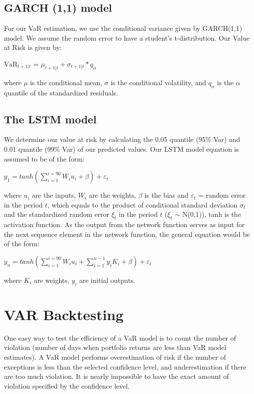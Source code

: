 \documentclass[a4paper,11pt,oneside]{book}
\begin{document}
\subsection{GARCH (1,1) model}

For our VaR estimation, we use the conditional variance given by GARCH(1,1) model. We assume the random error to have a student’s t-distribution. Our Value at Risk is given by:
\begin{center}
$\text{VaR}_{t+1|t}$ = $\mu_{t+1|t} + \sigma_{t+1|t} * q_{\alpha}$
\end{center}
where $\mu$ is the conditional mean, $\sigma$ is the conditional volatility, and $q_{\alpha}$ is the $\alpha$ quantile of the standardized residuals.

\subsection{The LSTM model}
We determine our value at risk by calculating the 0.05 quantile (95\% Var) and 0.01 quantile (99\% Var) of our predicted values. Our LSTM model equation is assumed to be of the form:
\begin{center}
	$y_1= tanh(\sum_{i=1}^{i=90}W_{i}u_{i}+\beta)+\varepsilon_t$
\end{center} 

where $u_{i}$ are the inputs, $W_i$ are the weights, $\beta$ is the bias and $\varepsilon_t$ = random error in the period $t$, which equals to the
product of conditional standard deviation $\sigma_t$ and  the
standardized random error $\xi_t$ in the period $t$ ($\xi_t$ $\sim$ N(0,1)), tanh is the activation function. As the output from the network function serves as input for the next sequence element in the network function, the general equation would be of the form:

\begin{center}
	$y_n= tanh(\sum_{i=1}^{i=90}W_{i}u_{i}+\sum_{i=1}^{n-1}y_{i}K_{i}+\beta)+\varepsilon_t$
\end{center} 
where $K_i$ are weights, $y_i$ are initial outputs.\newline

\section{VAR Backtesting}
One easy way to test the efficiency of a VaR model is to count the number of violation (number of days when portfolio returns are less than VaR model estimates). A VaR model performs overestimation of risk if the number of exceptions is less than the selected confidence level, and underestimation if there are too much violation. It is nearly impossible to have the exact amount of violation specified by the confidence level.\newline\newline
\end{document}
